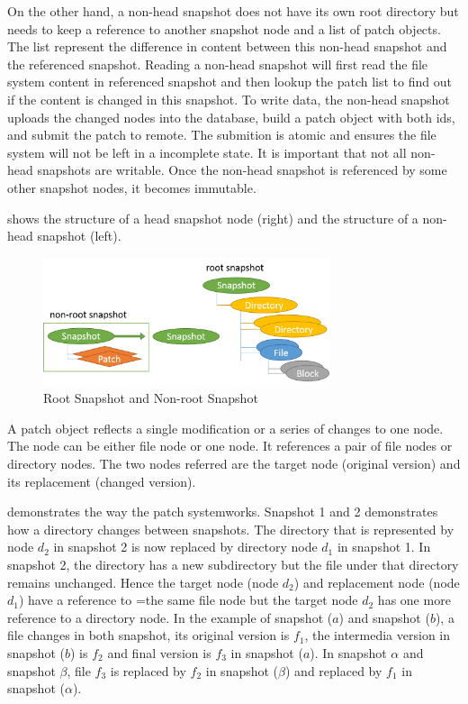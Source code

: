     On the other hand, a non-head snapshot does not have its own root directory but needs to keep a reference to another snapshot node and a list of patch objects. The list represent the difference in content between this non-head snapshot and the referenced snapshot. Reading a non-head snapshot will first read the file system content in referenced snapshot and then lookup the patch list to find out if the content is changed in this snapshot. To write data, the non-head snapshot uploads the changed nodes into the database, build a patch object with both ids, and submit the patch to remote. The submition is atomic and ensures the file system will not be left in a incomplete state. It is important that not all non-head snapshots are writable. Once the non-head snapshot is referenced by some other snapshot nodes, it becomes immutable.

     shows the structure of a head snapshot node (right) and the structure of a non-head snapshot (left).
    
\begin{figure}[hbtp]
\centering
\includegraphics[width=0.75\textwidth]{Chapter-4/figs/fig12.png}
\caption{Root Snapshot and Non-root Snapshot}
\label{fig:root_and_nonroot}
\end{figure}

    A patch object reflects a single modification or a series of changes to one node. The node can be either file node or one node. It references a pair of file nodes or directory nodes. The two nodes referred are the target node (original version) and its replacement (changed version).

     demonstrates the way the patch systemworks. Snapshot 1 and 2 demonstrates how a directory changes between snapshots. The directory that is represented by node $d_2$ in snapshot 2 is now replaced by directory node $d_1$ in snapshot 1. In snapshot 2, the directory has a new subdirectory but the file under that directory remains unchanged. Hence the target node (node $d_2$) and replacement node (node $d_1$) have a reference to =the same file node but the target node $d_2$ has one more reference to a directory node. In the example of snapshot ($a$) and snapshot ($b$), a file changes in both snapshot, its original version is $f_1$, the intermedia version in snapshot ($b$) is $f_2$ and final version is $f_3$ in snapshot ($a$). In snapshot $\alpha$ and snapshot $\beta$, file $f_3$ is replaced by $f_2$ in snapshot ($\beta$) and replaced by $f_1$ in snapshot ($\alpha$).  

